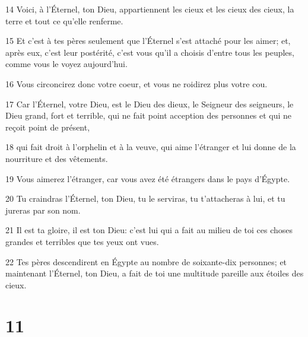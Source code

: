 \par 14 Voici, à l'Éternel, ton Dieu, appartiennent les cieux et les cieux des cieux, la terre et tout ce qu'elle renferme.
\par 15 Et c'est à tes pères seulement que l'Éternel s'est attaché pour les aimer; et, après eux, c'est leur postérité, c'est vous qu'il a choisis d'entre tous les peuples, comme vous le voyez aujourd'hui.
\par 16 Vous circoncirez donc votre coeur, et vous ne roidirez plus votre cou.
\par 17 Car l'Éternel, votre Dieu, est le Dieu des dieux, le Seigneur des seigneurs, le Dieu grand, fort et terrible, qui ne fait point acception des personnes et qui ne reçoit point de présent,
\par 18 qui fait droit à l'orphelin et à la veuve, qui aime l'étranger et lui donne de la nourriture et des vêtements.
\par 19 Vous aimerez l'étranger, car vous avez été étrangers dans le pays d'Égypte.
\par 20 Tu craindras l'Éternel, ton Dieu, tu le serviras, tu t'attacheras à lui, et tu jureras par son nom.
\par 21 Il est ta gloire, il est ton Dieu: c'est lui qui a fait au milieu de toi ces choses grandes et terribles que tes yeux ont vues.
\par 22 Tes pères descendirent en Égypte au nombre de soixante-dix personnes; et maintenant l'Éternel, ton Dieu, a fait de toi une multitude pareille aux étoiles des cieux.

\chapter{11}


